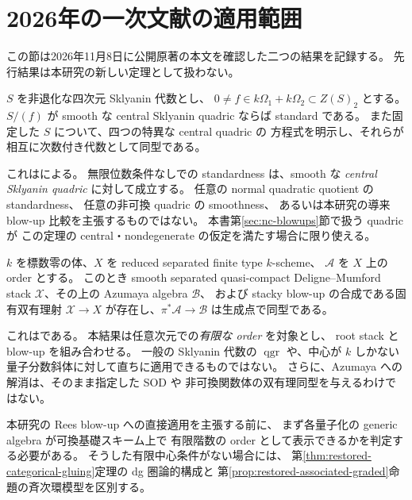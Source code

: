\section{2026年の一次文献の適用範囲}
\label{sec:restored-primary}
この節は2026年11月8日に公開原著の本文を確認した二つの結果を記録する。
先行結果は本研究の新しい定理として扱わない。

\begin{theorem}\label{thm:restored-muw}
$S$ を非退化な四次元 Sklyanin 代数とし、
$0\ne f\in k\Omega_1+k\Omega_2\subset Z(S)_2$ とする。
$S/(f)$ が smooth な central Sklyanin quadric ならば standard である。
また固定した $S$ について、四つの特異な central quadric の
方程式を明示し、それらが相互に次数付き代数として同型である。
\end{theorem}
\noindent
これは\cite[定理1.3、定理5.17]{MoriUeyamaWu2026}による。
無限位数条件なしでの standardness は、smooth な
\emph{central Sklyanin quadric} に対して成立する。
任意の normal quadratic quotient の standardness、
任意の非可換 quadric の smoothness、
あるいは本研究の導来 blow-up 比較を主張するものではない。
本書第\ref{sec:nc-blowups}節で扱う quadric が
この定理の central・nondegenerate の仮定を満たす場合に限り使える。

\begin{theorem}[De Deyn、既知]\label{thm:restored-dedeyn}
$k$ を標数零の体、$X$ を reduced separated finite type $k$-scheme、
$\mathcal A$ を $X$ 上の order とする。
このとき smooth separated quasi-compact Deligne--Mumford stack
$\mathcal X$、その上の Azumaya algebra $\mathcal B$、
および stacky blow-up の合成である固有双有理射 $\mathcal X\to X$
が存在し、$\pi^*\mathcal A\to\mathcal B$ は生成点で同型である。
\end{theorem}
\noindent
これは\cite[定理1.1]{DeDeyn2026}である。
本結果は任意次元での\emph{有限な order} を対象とし、
root stack と blow-up を組み合わせる。
一般の Sklyanin 代数の $\operatorname{qgr}$ や、中心が $k$ しかない
量子分数斜体に対して直ちに適用できるものではない。
さらに、Azumaya への解消は、そのまま指定した SOD や
非可換関数体の双有理同型を与えるわけではない。

本研究の Rees blow-up への直接適用を主張する前に、
まず各量子化の generic algebra が可換基礎スキーム上で
有限階数の order として表示できるかを判定する必要がある。
そうした有限中心条件がない場合には、
第\ref{thm:restored-categorical-gluing}定理の dg 圏論的構成と
第\ref{prop:restored-associated-graded}命題の斉次環模型を区別する。
